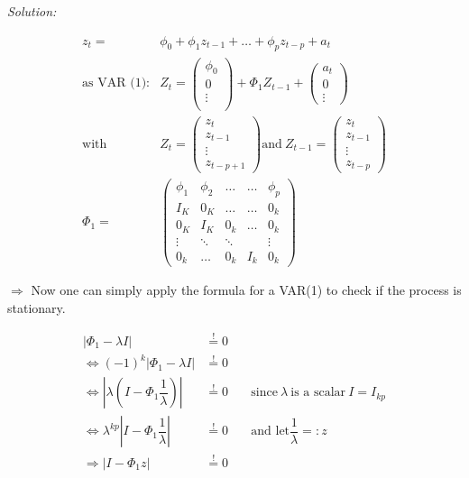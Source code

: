 \documentclass[12pt,a4paper]{article}
\begin{document}
\emph{Solution:}

\begin{align*}
  z_t = & \phi_0  + \phi_1 z_{t-1} + \ldots + \phi_p z_{t - p} + a_t\\
  \text{as VAR (1):} & Z_t = \begin{pmatrix} \phi_0 \\ 
  0\\
  \vdots \\
  \end{pmatrix} + 
  \Phi_1 Z_{t - 1} +
  \begin{pmatrix} 
  a_t \\  
  0\\
  \vdots 
  \end{pmatrix}\\
  \text{with} & Z_t =   
  \begin{pmatrix} 
   z_t \\
   z_{t-1} \\
   \vdots \\
   z_{t-p+1}
  \end{pmatrix}
  \text{and} \ Z_{t-1} = 
  \begin{pmatrix} 
   z_t \\
   z_{t-1} \\
   \vdots \\
   z_{t-p}
  \end{pmatrix}\\
  \Phi_1 = &
  \begin{pmatrix}
  \phi_1 & \phi_2 & \ldots  & \ldots & \phi_p \\
  I_K & 0_K & \ldots & \ldots & 0_k\\
  0_K & I_K & 0_k & \ldots & 0_k\\
  \vdots & \ddots & \ddots &  & \vdots\\
  0_k & \ldots &  0_k & I_k & 0_k
  \end{pmatrix}
\end{align*}

\(\Rightarrow\) Now one can simply apply the formula for a VAR(1) to
check if the process is stationary.

\begin{align*}
\left| \Phi_1 - \lambda I \right| & \overset{!}{=} 0 \\
\Leftrightarrow (-1)^k \left| \Phi_1 - \lambda I \right| & \overset{!}{=} 0 \\
\Leftrightarrow \left| \lambda \left( I -  \Phi_1 \dfrac{1}{\lambda} \right)  \right| & \overset{!}{=} 0 \quad &  \text{since} \ \lambda \ \text{is a scalar} \ I = I_{kp} \\ 
\Leftrightarrow  \lambda^{kp} \left| I - \Phi_{1} \dfrac{1}{\lambda} \right|  & \overset{!}{=} 0 \quad & \text{and let} \dfrac{1}{\lambda} =: z \\
\Rightarrow \left| I - \Phi_1 z \right| & \overset{!}{=} 0 
\end{align*}
\end{document}
